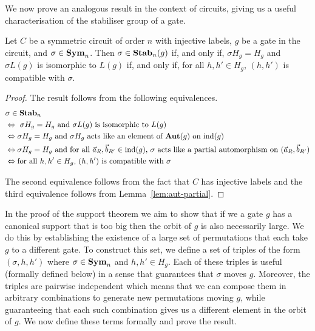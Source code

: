 \documentclass[../main/thesis.tex]{subfiles}
\begin{document}
We now prove an analogous result in the context of circuits, giving us a useful
characterisation of the stabiliser group of a gate.

\begin{lem}
  Let $C$ be a symmetric circuit of order $n$ with injective labels, $g$ be a
  gate in the circuit, and $\sigma \in \text{\textbf{Sym}}_n$. Then $\sigma \in \text{\textbf{Stab}}_n(g)$ if,
  and only if, $\sigma H_g = H_g$ and $\sigma L(g)$ is isomorphic to $L(g)$ if,
  and only if, for all $h, h' \in H_g$, $(h, h')$ is compatible with $\sigma$.
  \label{lem:isostab-compatible}
\end{lem}

\begin{proof}
  The result follows from the following equivalences.
  \begin{align*}
    & \sigma \in \text{\textbf{Stab}}_n\\
    & \Leftrightarrow \text{ $\sigma H_g = H_g$ and $\sigma L(g)$ is
      isomorphic to $L(g)$}\\
    & \Leftrightarrow \text{$\sigma H_g = H_g$ and $\sigma H_g$ acts like an
      element of $\text{\textbf{Aut}} (g)$ on $\text{\upshape ind}(g)$} \\
    & \Leftrightarrow \text{$\sigma H_g = H_g$ and for all $\vec{a}_R,
      \vec{b}_{R'} \in \text{\upshape ind}(g)$, $\sigma$ acts like a partial automorphism on
      $(\vec{a}_R, \vec{b}_{R'})$}\\
    & \Leftrightarrow \text{for all $h, h' \in H_g$, $(h, h')$ is compatible with
      $\sigma$}
  \end{align*}

  The second equivalence follows from the fact that $C$ has injective labels and
  the third equivalence follows from Lemma~\ref{lem:aut-partial}.

\end{proof}

In the proof of the support theorem we aim to show that if we a gate $g$ has a
canonical support that is too big then the orbit of $g$ is also necessarily
large. We do this by establishing the existence of a large set of permutations
that each take $g$ to a different gate. To construct this set, we define a set
of triples of the form $(\sigma, h, h')$ where $\sigma \in \text{\textbf{Sym}}_n$ and $h,h' \in
H_g$. Each of these triples is useful (formally defined below) in a sense that
guarantees that $\sigma$ moves $g$. Moreover, the triples are pairwise
independent which means that we can compose them in arbitrary combinations to
generate new permutations moving $g$, while guaranteeing that each such
combination gives us a different element in the orbit of $g$. We now define
these terms formally and prove the result.
\end{document}
